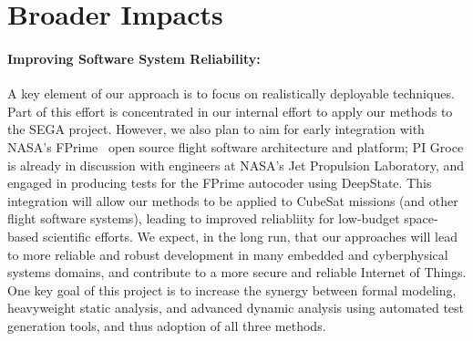 \section{Broader Impacts}

\paragraph{Improving Software System Reliability:} A key element of
our approach is to focus on realistically deployable techniques.  Part
of this effort is concentrated in our internal effort to apply our
methods to the SEGA project.  However, we also plan
to aim for early integration with NASA's FPrime~\cite{fprime,fprimerepo}
open source
flight software architecture and platform; PI Groce is already in
discussion with engineers at NASA's Jet Propulsion Laboratory, and
engaged in producing tests for the FPrime autocoder using DeepState.
This integration will allow our
methods to be applied to CubeSat missions (and other flight software
systems), leading to improved reliabliity for low-budget space-based
scientific efforts.  We expect, in the long run, that our approaches
will lead to more reliable and robust development in many embedded and
cyberphysical systems domains, and contribute to a more secure and
reliable Internet of Things.  One key goal of this project is to
increase the synergy between formal modeling, heavyweight static
analysis, and advanced dynamic analysis using automated test
generation tools, and thus adoption of all three methods.

